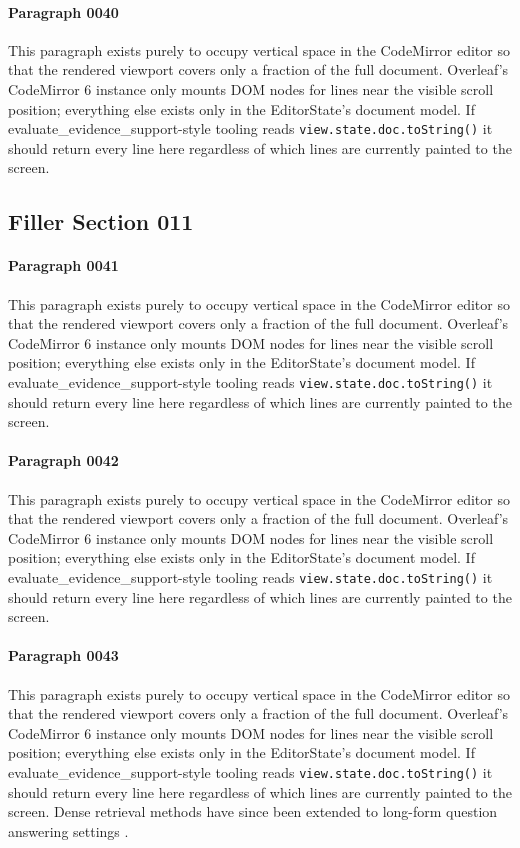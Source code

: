 \documentclass{article}
\begin{document}
\paragraph{Paragraph 0040}
This paragraph exists purely to occupy vertical space in the CodeMirror editor so that the rendered viewport covers only a fraction of the full document. Overleaf's CodeMirror 6 instance only mounts DOM nodes for lines near the visible scroll position; everything else exists only in the EditorState's document model. If evaluate\_evidence\_support-style tooling reads \texttt{view.state.doc.toString()} it should return every line here regardless of which lines are currently painted to the screen.

\subsection{Filler Section 011}
\paragraph{Paragraph 0041}
This paragraph exists purely to occupy vertical space in the CodeMirror editor so that the rendered viewport covers only a fraction of the full document. Overleaf's CodeMirror 6 instance only mounts DOM nodes for lines near the visible scroll position; everything else exists only in the EditorState's document model. If evaluate\_evidence\_support-style tooling reads \texttt{view.state.doc.toString()} it should return every line here regardless of which lines are currently painted to the screen.

\paragraph{Paragraph 0042}
This paragraph exists purely to occupy vertical space in the CodeMirror editor so that the rendered viewport covers only a fraction of the full document. Overleaf's CodeMirror 6 instance only mounts DOM nodes for lines near the visible scroll position; everything else exists only in the EditorState's document model. If evaluate\_evidence\_support-style tooling reads \texttt{view.state.doc.toString()} it should return every line here regardless of which lines are currently painted to the screen.

\paragraph{Paragraph 0043}
This paragraph exists purely to occupy vertical space in the CodeMirror editor so that the rendered viewport covers only a fraction of the full document. Overleaf's CodeMirror 6 instance only mounts DOM nodes for lines near the visible scroll position; everything else exists only in the EditorState's document model. If evaluate\_evidence\_support-style tooling reads \texttt{view.state.doc.toString()} it should return every line here regardless of which lines are currently painted to the screen. Dense retrieval methods have since been extended to long-form question answering settings \citep{singh2021retrieval}.
\end{document}
